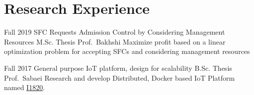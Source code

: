 \section{Research Experience}

\cventry%
  {Fall 2019}
  {SFC Requests Admission Control by Considering Management Resources}
  {M.Sc. Thesis}
  {Prof.\ Bakhshi}
  {}
  {Maximize profit based on a linear optimization problem for accepting SFCs and considering management resources}

\cventry%
  {Fall 2017}
  {General purpose IoT platform, design for scalability}
  {B.Sc. Thesis}
  {Prof.\ Sabaei}
  {}{%
    Research and develop Distributed, Docker based IoT Platform named \href{https://github.com/I1820}{I1820}.
  }
